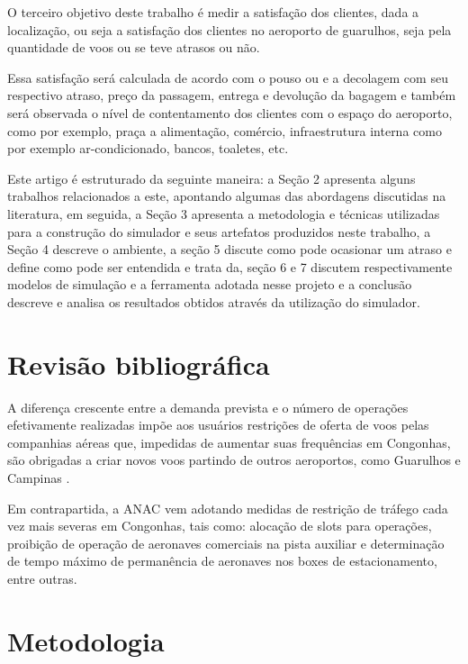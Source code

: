 \documentclass[12pt]{article}
\begin{document}
  O terceiro objetivo deste trabalho é medir a satisfação dos clientes, dada
  a localização, ou seja a satisfação dos clientes no aeroporto de guarulhos, 
  seja pela quantidade de voos ou se teve atrasos ou não.
  
  Essa satisfação será calculada de acordo com o pouso ou e a decolagem com 
  seu respectivo atraso, preço da passagem, entrega e devolução da bagagem
  e também será observada o nível de contentamento dos clientes com o espaço
  do aeroporto, como por exemplo, praça a alimentação, comércio, 
  infraestrutura interna como por exemplo ar-condicionado, bancos, toaletes,
  etc.
  
  
  Este artigo é estruturado da seguinte maneira: a Seção 2 apresenta alguns trabalhos
  relacionados a este, apontando algumas das abordagens discutidas na literatura,
  em seguida, a Seção 3 apresenta a metodologia e técnicas utilizadas para a construção 
  do simulador e seus artefatos produzidos neste trabalho, a Seção 4 descreve o ambiente,
  a seção 5 discute como pode ocasionar um atraso e define como pode ser entendida e trata
  da, seção 6 e 7 discutem respectivamente modelos de simulação e a ferramenta adotada
  nesse projeto e a conclusão descreve e analisa os resultados obtidos através da 
  utilização do simulador.
    
  
  \section{Revisão bibliográfica} \label{sec:revisaobibliografica}
  
  A diferença crescente entre a demanda prevista e o número de
  operações efetivamente realizadas impõe aos usuários
  restrições de oferta de voos pelas companhias aéreas que,
  impedidas de aumentar suas frequências em Congonhas, são 
  obrigadas a criar novos voos partindo de outros aeroportos,
  como Guarulhos e Campinas \cite{boulic:91}.
  
  Em contrapartida, a ANAC vem adotando medidas de restrição 
  de tráfego cada vez mais severas em Congonhas, tais como: 
  alocação de slots para operações, proibição de operação de 
  aeronaves comerciais na pista auxiliar e determinação de tempo
  máximo de permanência de aeronaves nos boxes de estacionamento,
  entre outras\cite{Medau:09}. 
  
  
  \section{Metodologia}
  
\end{document}
